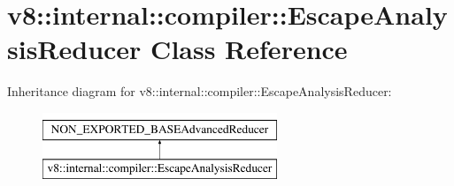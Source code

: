 \hypertarget{classv8_1_1internal_1_1compiler_1_1EscapeAnalysisReducer}{}\section{v8\+:\+:internal\+:\+:compiler\+:\+:Escape\+Analysis\+Reducer Class Reference}
\label{classv8_1_1internal_1_1compiler_1_1EscapeAnalysisReducer}
Inheritance diagram for v8\+:\+:internal\+:\+:compiler\+:\+:Escape\+Analysis\+Reducer\+:\begin{figure}[H]
\begin{center}
\leavevmode
\includegraphics[height=2.000000cm]{classv8_1_1internal_1_1compiler_1_1EscapeAnalysisReducer}
\end{center}
\end{figure}
